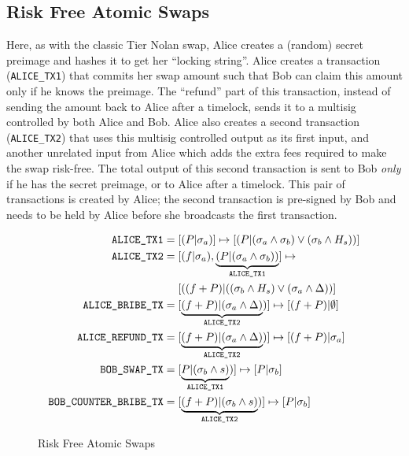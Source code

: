 \subsection{Risk Free Atomic Swaps}
\label{bribing:risk_free_atomic_swap}
Here, as with the classic Tier Nolan swap, Alice creates a (random) secret preimage and hashes it to get her ``locking string''. Alice creates a transaction ({\texttt{ALICE\_TX1}}) that commits her swap amount such that Bob can claim this amount only if he knows the preimage. The ``refund'' part of this transaction, instead of sending the amount back to Alice after a timelock, sends it to a multisig controlled by both Alice and Bob. Alice also creates a second transaction ({\texttt{ALICE\_TX2}}) that uses this multisig controlled output as its first input, and another unrelated input from Alice which adds the extra fees required to make the swap risk-free. The total output of this second transaction is sent to Bob \textit{only} if he has the secret preimage, or to Alice after a timelock. This pair of transactions is created by Alice; the second transaction is pre-signed by Bob and needs to be held by Alice before she broadcasts the first transaction. 

\begin{figure}[hbt!]
    \centering
    \caption{Risk Free Atomic Swaps}
    \label{fig:risk_free_atomic_swap}
\begin{align*}
    \texttt{ALICE\_TX1} &= [(P|\sigma_a)] \mapsto [(P|(\sigma_a \land \sigma_b) \lor (\sigma_b \land H_{s}))] \\
    \texttt{ALICE\_TX2} &= [(f|\sigma_a), \underbrace{(P|(\sigma_a \land \sigma_b))}_{\texttt{ALICE\_TX1}}] \mapsto \\ 
    &\phantomrel{=} {} [((f+P)| ((\sigma_b \land H_{s}) \lor (\sigma_a \land \Delta))]\\ 
    \texttt{ALICE\_BRIBE\_TX} &= [\underbrace{(f+P)|(\sigma_a \land \Delta)}_{\texttt{ALICE\_TX2}})] \mapsto [(f+P)| \emptyset]\\  
    \texttt{ALICE\_REFUND\_TX} &= [\underbrace{(f+P)|(\sigma_a \land \Delta)}_{\texttt{ALICE\_TX2}})] \mapsto [(f+P)| \sigma_a]\\  
    \texttt{BOB\_SWAP\_TX} &= [\underbrace{P|(\sigma_b \land s)}_{\texttt{ALICE\_TX1}})] \mapsto [P| \sigma_b]\\
    \texttt{BOB\_COUNTER\_BRIBE\_TX} &= [\underbrace{(f+P)|(\sigma_b \land s)}_{\texttt{ALICE\_TX2}})] \mapsto [P| \sigma_b]\\
\end{align*}
\end{figure}

